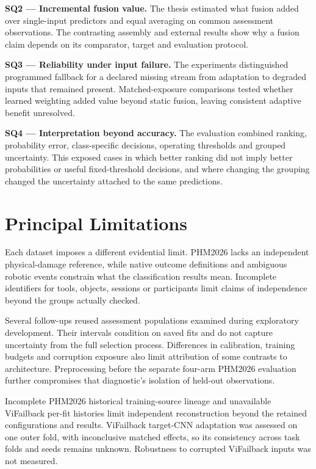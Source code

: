 \textbf{SQ2 --- Incremental fusion value.} The thesis estimated what fusion added over
single-input predictors and equal averaging on common assessment observations. The
contrasting assembly and external results show why a fusion claim depends on its
comparator, target and evaluation protocol.

\textbf{SQ3 --- Reliability under input failure.} The experiments distinguished
programmed fallback for a declared missing stream from adaptation to degraded inputs
that remained present. Matched-exposure comparisons tested whether learned weighting
added value beyond static fusion, leaving consistent adaptive benefit unresolved.

\textbf{SQ4 --- Interpretation beyond accuracy.} The evaluation combined ranking,
probability error, class-specific decisions, operating thresholds and grouped
uncertainty. This exposed cases in which better ranking did not imply better
probabilities or useful fixed-threshold decisions, and where changing the grouping
changed the uncertainty attached to the same predictions.

\section{Principal Limitations}
Each dataset imposes a different evidential limit. PHM2026 lacks an independent
physical-damage reference, while native outcome definitions and ambiguous robotic events
constrain what the classification results mean. Incomplete identifiers for tools,
objects, sessions or participants limit claims of independence beyond the groups
actually checked.

Several follow-ups reused assessment populations examined during exploratory
development. Their intervals condition on saved fits and do not capture uncertainty from
the full selection process. Differences in calibration, training budgets and corruption
exposure also limit attribution of some contrasts to architecture. Preprocessing before
the separate four-arm PHM2026 evaluation further compromises that diagnostic's isolation of
held-out observations.

Incomplete PHM2026 historical training-source lineage and unavailable ViFailback per-fit
histories limit independent reconstruction beyond the retained configurations and
results. ViFailback target-CNN adaptation was assessed on one outer fold, with
inconclusive matched effects, so its consistency across task folds and seeds remains
unknown. Robustness to corrupted ViFailback inputs was not measured.

